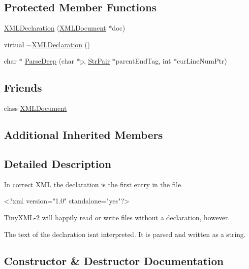 \subsection*{Protected Member Functions}
\begin{DoxyCompactItemize}
\item 
\mbox{\hyperlink{classtinyxml2_1_1_x_m_l_declaration_aef9586f2ce5df5feba74dde49a242b06}{X\+M\+L\+Declaration}} (\mbox{\hyperlink{classtinyxml2_1_1_x_m_l_document}{X\+M\+L\+Document}} $\ast$doc)
\item 
virtual \mbox{\hyperlink{classtinyxml2_1_1_x_m_l_declaration_ab93d5bf4f5d58b4144963cf739cf6dcc}{$\sim$\+X\+M\+L\+Declaration}} ()
\item 
char $\ast$ \mbox{\hyperlink{classtinyxml2_1_1_x_m_l_declaration_a42a2a36f4d78dc745063b79c16538b9b}{Parse\+Deep}} (char $\ast$p, \mbox{\hyperlink{classtinyxml2_1_1_str_pair}{Str\+Pair}} $\ast$parent\+End\+Tag, int $\ast$cur\+Line\+Num\+Ptr)
\end{DoxyCompactItemize}
\subsection*{Friends}
\begin{DoxyCompactItemize}
\item 
class \mbox{\hyperlink{classtinyxml2_1_1_x_m_l_declaration_a4eee3bda60c60a30e4e8cd4ea91c4c6e}{X\+M\+L\+Document}}
\end{DoxyCompactItemize}
\subsection*{Additional Inherited Members}


\subsection{Detailed Description}
In correct X\+ML the declaration is the first entry in the file. \begin{DoxyVerb}    <?xml version="1.0" standalone="yes"?>
\end{DoxyVerb}


Tiny\+X\+M\+L-\/2 will happily read or write files without a declaration, however.

The text of the declaration isn\textquotesingle{}t interpreted. It is parsed and written as a string. 

\subsection{Constructor \& Destructor Documentation}
\mbox{\label{classtinyxml2_1_1_x_m_l_declaration_aef9586f2ce5df5feba74dde49a242b06}} 
